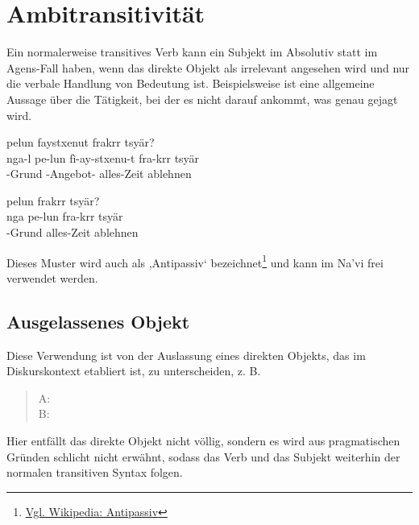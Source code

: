 \section{Ambitransitivität}
\noindent Ein normalerweise transitives Verb kann ein Subjekt im Absolutiv statt im Agens-Fall haben, wenn das direkte Objekt als irrelevant angesehen wird und nur die verbale Handlung von Bedeutung ist. Beispielsweise ist   eine allgemeine Aussage über die Tätigkeit, bei der es nicht darauf ankommt, was genau gejagt wird.  

\begin{interlin}
	\glll \Npawl{} pelun faystxenut frakrr tsyär? \\
	nga-l pe-lun fì-ay-stxenu-t fra-krr tsyär \\
	 -Grund -Angebot- alles-Zeit ablehnen \\
\end{interlin}

\begin{interlin}
	\glll \Npawl{} pelun frakrr tsyär? \\
	nga pe-lun fra-krr tsyär \\
	 -Grund alles-Zeit ablehnen \\
\end{interlin}

\noindent Dieses Muster wird auch als ,Antipassiv‘ bezeichnet\footnote{\href{https://de.wikipedia.org/wiki/Antipassiv}{Vgl. Wikipedia: Antipassiv}} und kann im Na'vi frei verwendet werden. 

\subsection{Ausgelassenes Objekt} Diese Verwendung ist von der Auslassung eines direkten Objekts, das im Diskurskontext etabliert ist, zu unterscheiden, z. B.

\begin{quotation}
	\noindent A:  \\
	\noindent B:  
\end{quotation}

\noindent Hier entfällt das direkte Objekt nicht völlig, sondern es wird aus pragmatischen Gründen schlicht nicht erwähnt, sodass das Verb und das Subjekt weiterhin der normalen transitiven Syntax folgen.

